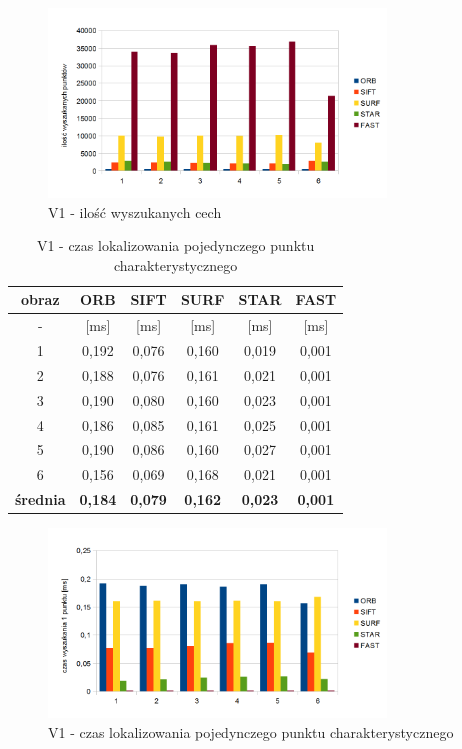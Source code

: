 \begin{figure}
\centering
\includegraphics[width=0.8\textwidth]{pict/slowik/v1/f1.png}
\caption{V1 - ilość wyszukanych cech}
\label{fig:v1_f1}
\end{figure}


\begin{table}[htbp]
  \centering
  \caption{V1 - czas lokalizowania pojedynczego punktu charakterystycznego}
    \begin{tabular}{|c|c|c|c|c|c|}
    \hline
    obraz & \textbf{ORB} & \textbf{SIFT} & \textbf{SURF} & \textbf{STAR} & \textbf{FAST} \\
    \hline
    -  & [ms] & [ms] & [ms] & [ms] & [ms] \\\hline
    1 & 0,192 & 0,076 & 0,160 & 0,019 & 0,001 \\
    2 & 0,188 & 0,076 & 0,161 & 0,021 & 0,001 \\
    3 & 0,190 & 0,080 & 0,160 & 0,023 & 0,001 \\
    4 & 0,186 & 0,085 & 0,161 & 0,025 & 0,001 \\
    5 & 0,190 & 0,086 & 0,160 & 0,027 & 0,001 \\
    6 & 0,156 & 0,069 & 0,168 & 0,021 & 0,001 \\\hline
    \textbf{średnia} & \textbf{0,184} & \textbf{0,079} & \textbf{0,162} & \textbf{0,023} & \textbf{0,001} \\
    \hline
    \end{tabular}%
  \label{tab:v1_f2}%
\end{table}%


\begin{figure}
\centering
\includegraphics[width=0.8\textwidth]{pict/slowik/v1/f2.png}
\caption{V1 - czas lokalizowania pojedynczego punktu charakterystycznego}
\label{fig:v1_f2}
\end{figure}

